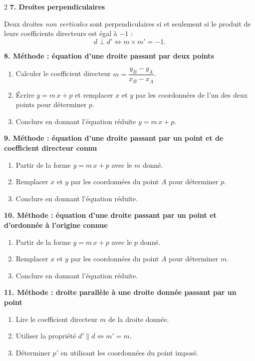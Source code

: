 \documentclass[11pt,a4paper]{article}
\begin{document}
\begin{multicols}{2}
\medskip
\noindent\textbf{7. Droites perpendiculaires}

Deux droites \emph{non verticales} sont perpendiculaires si et seulement si
le produit de leurs coefficients directeurs est égal à $-1$ :
\[
d \perp d' \iff m \times m' = -1.
\]

\medskip
\noindent\textbf{8. Méthode : équation d'une droite passant par deux points}

\begin{enumerate}[leftmargin=14pt, itemsep=1pt]
\item Calculer le coefficient directeur $m = \dfrac{y_B - y_A}{x_B - x_A}$.
\item Écrire $y = m\,x + p$ et remplacer $x$ et $y$ par les coordonnées de l'un
des deux points pour déterminer $p$.
\item Conclure en donnant l'équation réduite $y = m\,x + p$.
\end{enumerate}

\medskip
\noindent\textbf{9. Méthode : équation d'une droite passant par un point et de
coefficient directeur connu}

\begin{enumerate}[leftmargin=14pt, itemsep=1pt]
\item Partir de la forme $y = m\,x + p$ avec le $m$ donné.
\item Remplacer $x$ et $y$ par les coordonnées du point $A$ pour déterminer $p$.
\item Conclure en donnant l'équation réduite.
\end{enumerate}

\medskip
\noindent\textbf{10. Méthode : équation d'une droite passant par un point et
d'ordonnée à l'origine connue}

\begin{enumerate}[leftmargin=14pt, itemsep=1pt]
\item Partir de la forme $y = m\,x + p$ avec le $p$ donné.
\item Remplacer $x$ et $y$ par les coordonnées du point $A$ pour déterminer $m$.
\item Conclure en donnant l'équation réduite.
\end{enumerate}

\medskip
\noindent\textbf{11. Méthode : droite parallèle à une droite donnée passant par un point}

\begin{enumerate}[leftmargin=14pt, itemsep=1pt]
\item Lire le coefficient directeur $m$ de la droite donnée.
\item Utiliser la propriété $d' \parallel d \iff m' = m$.
\item Déterminer $p'$ en utilisant les coordonnées du point imposé.
\end{enumerate}


\end{multicols}
\end{document}
